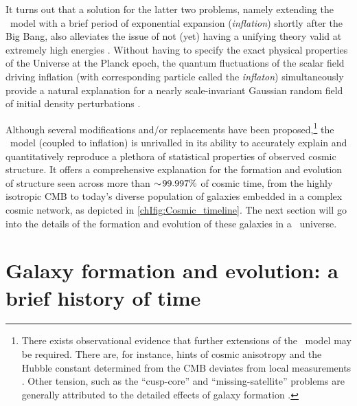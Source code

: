 It turns out that a solution for the latter two problems, namely extending the \LCDM\ model with a brief period of exponential expansion (\textit{inflation}) shortly after the Big Bang, also alleviates the issue of not (yet) having a unifying theory valid at extremely high energies \citep{1980PhLB...91...99S, 1980ApJ...241L..59K, 1981PhRvD..23..347G, 1982PhLB..108..389L, 1982PhRvL..48.1220A}. Without having to specify the exact physical properties of the Universe at the Planck epoch, the quantum fluctuations of the scalar field driving inflation (with corresponding particle called the \textit{inflaton}) simultaneously provide a natural explanation for a nearly scale-invariant Gaussian random field of initial density perturbations \citep{1982PhLB..115..295H, 1982PhRvL..49.1110G, 1983PhRvD..28..679B}.

Although several modifications and/or replacements have been proposed,\footnote{There exists observational evidence that further extensions of the \LCDM\ model may be required. There are, for instance, hints of cosmic anisotropy \citep[e.g.][]{2022arXiv220805018P} and the Hubble constant determined from the CMB deviates from local measurements \citep{2020A&A...641A...6P}. Other tension, such as the ``cusp-core'' and ``missing-satellite'' problems are generally attributed to the detailed effects of galaxy formation \citep[``baryonic physics''; e.g.][]{2012MNRAS.421.3464P, 2016ApJ...827L..23W}.} the \LCDM\ model (coupled to inflation) is unrivalled in its ability to accurately explain and quantitatively reproduce a plethora of statistical properties of observed cosmic structure. It offers a comprehensive explanation for the formation and evolution of structure seen across more than $\sim \! 99.997\%$ of cosmic time, from the highly isotropic CMB to today's diverse population of galaxies embedded in a complex cosmic network, as depicted in \cref{chIfig:Cosmic_timeline}. The next section will go into the details of the formation and evolution of these galaxies in a \LCDM\ universe.

\section{Galaxy formation and evolution: a brief history of time}

